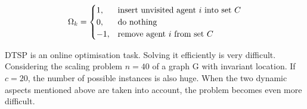$$
\Omega_{k} = \begin{cases}
1 , & \text{insert unvisited agent $ i $ into set $ C $} \\
0 , & \text{do nothing} \\
-1 , & \text{remove agent $ i $ from set $ C $}
\end{cases}
$$

DTSP is an online optimisation task. Solving it efficiently is very difficult. Considering the scaling problem $ n = 40 $ of a graph G with invariant location. If $ c = 20 $, the number of possible instances is also huge. When the two dynamic aspects mentioned above are taken into account, the problem becomes even more difficult. 